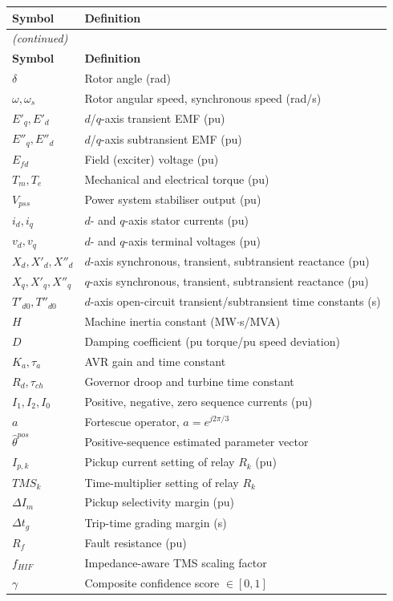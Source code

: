 \documentclass[12pt,a4paper]{article}
\theoremstyle{definition}
\theoremstyle{plain}
\begin{document}
\begin{longtable}{p{3.2cm}p{10cm}}
\toprule
\textbf{Symbol} & \textbf{Definition} \\
\midrule
\endfirsthead
\multicolumn{2}{l}{\textit{(continued)}} \\
\toprule
\textbf{Symbol} & \textbf{Definition} \\
\midrule
\endhead
\bottomrule
\endlastfoot
%
$\delta$         & Rotor angle (rad) \\
$\omega, \omega_s$ & Rotor angular speed, synchronous speed (rad/s) \\
$E'_q, E'_d$     & $d$/$q$-axis transient EMF (pu) \\
$E''_q, E''_d$   & $d$/$q$-axis subtransient EMF (pu) \\
$E_{fd}$         & Field (exciter) voltage (pu) \\
$T_m, T_e$       & Mechanical and electrical torque (pu) \\
$V_{pss}$        & Power system stabiliser output (pu) \\
$i_d, i_q$       & $d$- and $q$-axis stator currents (pu) \\
$v_d, v_q$       & $d$- and $q$-axis terminal voltages (pu) \\
$X_d, X'_d, X''_d$ & $d$-axis synchronous, transient, subtransient reactance (pu) \\
$X_q, X'_q, X''_q$ & $q$-axis synchronous, transient, subtransient reactance (pu) \\
$T'_{d0}, T''_{d0}$ & $d$-axis open-circuit transient/subtransient time constants (s) \\
$H$              & Machine inertia constant (MW$\cdot$s/MVA) \\
$D$              & Damping coefficient (pu torque/pu speed deviation) \\
$K_a, \tau_a$    & AVR gain and time constant \\
$R_d, \tau_{ch}$ & Governor droop and turbine time constant \\
$I_1, I_2, I_0$  & Positive, negative, zero sequence currents (pu) \\
$a$              & Fortescue operator, $a = e^{j2\pi/3}$ \\
$\hat{\theta}^{pos}$ & Positive-sequence estimated parameter vector \\
$I_{p,k}$        & Pickup current setting of relay $R_k$ (pu) \\
$TMS_k$          & Time-multiplier setting of relay $R_k$ \\
$\Delta I_m$     & Pickup selectivity margin (pu) \\
$\Delta t_g$     & Trip-time grading margin (s) \\
$R_f$            & Fault resistance (pu) \\
$f_{HIF}$        & Impedance-aware TMS scaling factor \\
$\gamma$         & Composite confidence score $\in[0,1]$ \\
\end{longtable}
\end{document}
